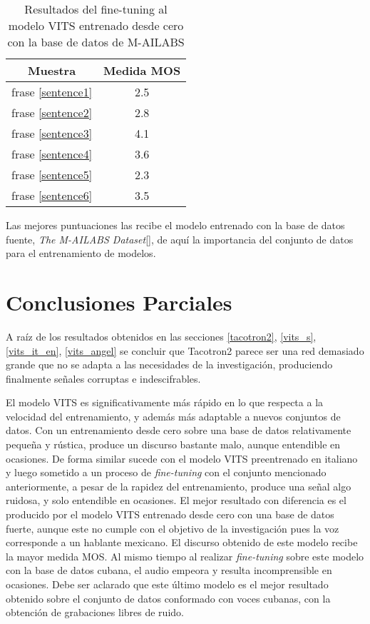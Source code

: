 \begin{table}[H]
	\begin{center} 
		\begin{tabular}{ |c|c| } 
			\hline
			Muestra & Medida MOS \\
			\hline
			frase \ref{sentence1} & 2.5 \\
			frase \ref{sentence2} & 2.8 \\
			frase \ref{sentence3} & 4.1 \\
			frase \ref{sentence4} & 3.6 \\
			frase \ref{sentence5} & 2.3 \\
			frase \ref{sentence6} & 3.5 \\
			\hline
		\end{tabular}
		\caption{Resultados del fine-tuning al modelo VITS entrenado desde cero con la base de datos de M-AILABS} 
	\end{center}
\end{table}

Las mejores puntuaciones las recibe el modelo entrenado con la base de datos fuente, \textit{The M-AILABS Dataset}[\cite{mailabs}], de aquí la importancia del conjunto de datos para el entrenamiento de modelos.\\

\section{Conclusiones Parciales}

A raíz de los resultados obtenidos en las secciones \ref{tacotron2}, \ref{vits_s}, \ref{vits_it_en}, \ref{vits_angel} se concluir que Tacotron2 parece ser una red demasiado grande que no se adapta a las necesidades de la investigación, produciendo finalmente señales corruptas e indescifrables.

El modelo VITS es significativamente más rápido en lo que respecta a la velocidad del entrenamiento, y además más adaptable a nuevos conjuntos de datos. Con un entrenamiento desde cero sobre una base de datos relativamente pequeña y rústica, produce un discurso bastante malo, aunque entendible en ocasiones. De forma similar sucede con el modelo VITS preentrenado en italiano y luego sometido a un proceso de \textit{fine-tuning} con el conjunto mencionado anteriormente, a pesar de la rapidez del entrenamiento, produce una señal algo ruidosa, y solo entendible en ocasiones. El mejor resultado con diferencia es el producido por el modelo VITS entrenado desde cero con una base de datos fuerte, aunque este no cumple con el objetivo de la investigación pues la voz corresponde a un hablante mexicano. El discurso obtenido de este modelo recibe la mayor medida MOS. Al mismo tiempo al realizar \textit{fine-tuning} sobre este modelo con la base de datos cubana, el audio empeora y resulta incomprensible en ocasiones. Debe ser aclarado que este último modelo es el mejor resultado obtenido sobre el conjunto de datos conformado con voces cubanas, con la obtención de grabaciones libres de ruido. 




